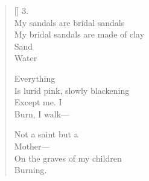 \begin{verse}[\versewidth]
3.\\
My sandals are bridal sandals\\
My bridal sandals are made of clay\\
Sand\\
Water

Everything\\
Is lurid pink, slowly blackening\\
Except me.  I\\
Burn, I walk---

Not a saint but a\\
Mother---\\
On the graves of my children\\
Burning.
\end{verse}
